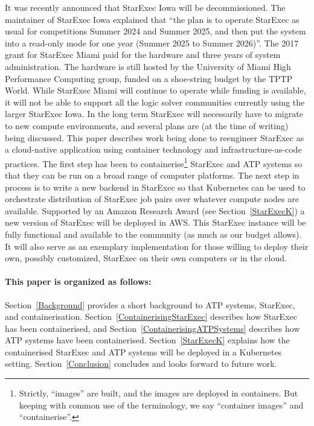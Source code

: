 \documentclass{easychair}
\begin{document}
It was recently announced that StarExec Iowa will be decommissioned. 
The maintainer of StarExec Iowa explained that ``the plan is to operate StarExec as usual for 
competitions Summer 2024 and Summer 2025, and then put the system into a read-only mode for one 
year (Summer 2025 to Summer 2026)''.
The 2017 grant for StarExec Miami paid for the hardware and three years of system administration.
The hardware is still hosted by the University of Miami High Performance Computing group,
funded on a shoe-string budget by the TPTP World.
While StarExec Miami will continue to operate while funding is available, it will not be able
to support all the logic solver communities currently using the larger StarExec Iowa.
In the long term StarExec will necessarily have to migrate to new compute environments, and 
several plans are (at the time of writing) being discussed.
This paper describes work being done to reengineer StarExec as a cloud-native application using
container technology and infrastructure-as-code practices.
The first step has been to containerise\footnote{%
Strictly, ``images'' are built, and the images are deployed in containers. 
But keeping with common use of the terminology, we say ``container images'' and ``containerise''.} 
StarExec and ATP systems so that they can be run on a broad range of computer platforms.
The next step in process is to write a new backend in StarExec so that Kubernetes can be used to
orchestrate distribution of StarExec job pairs over whatever compute nodes are available.
Supported by an Amazon Research Award (see Section~\ref{StarExecK}) a new version of StarExec
will be deployed in AWS.
This StarExec instance will be fully functional and available to the community (as much as our 
budget allows). 
It will also serve as an exemplary implementation for those willing to deploy their own, possibly 
customized, StarExec on their own computers or in the cloud.

\paragraph{This paper is organized as follows:}
Section~\ref{Background} provides a short background to ATP systems, StarExec, and 
containerisation.
Section~\ref{ContainerisingStarExec} describes how StarExec has been containerised, and
Section~\ref{ContainerisingATPSystems} describes how ATP systems have been containerised.
Section~\ref{StarExecK} explains how the containerised StarExec and ATP systems will be deployed 
in a Kubernetes setting.
Section~\ref{Conclusion} concludes and looks forward to future work.
\end{document}
